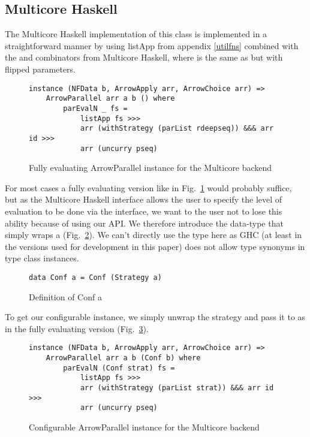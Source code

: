 \subsection{Multicore Haskell}
The Multicore Haskell implementation of this class is implemented in a straightforward manner by using listApp from appendix \ref{utilfns} combined with the  and  combinators from Multicore Haskell, where  is the same as  but with flipped parameters.
\begin{figure}[h]
\begin{lstlisting}[frame=htrbl]
instance (NFData b, ArrowApply arr, ArrowChoice arr) =>
	ArrowParallel arr a b () where
    	parEvalN _ fs =
       		listApp fs >>>
        	arr (withStrategy (parList rdeepseq)) &&& arr id >>>
        	arr (uncurry pseq)
\end{lstlisting}%
\caption{Fully evaluating ArrowParallel instance for the Multicore backend}
\label{fig:ArrowParallelMulticoreRdeepseq}
\end{figure}
For most cases a fully evaluating version like in Fig.~\ref{fig:ArrowParallelMulticoreRdeepseq} would probably suffice, but as the Multicore Haskell interface allows the user to specify the level of evaluation to be done via the  interface, we want to the user not to lose this ability because of using our API. We therefore introduce the  data-type that simply wraps a  (Fig.~\ref{fig:confa}). We can't directly use the  type here as GHC (at least in the versions used for development in this paper) does not allow type synonyms in type class instances.
\begin{figure}[h]
\begin{lstlisting}[frame=htrbl]
data Conf a = Conf (Strategy a)
\end{lstlisting}
\caption{Definition of Conf a}
\label{fig:confa}
\end{figure}
To get our configurable  instance, we simply unwrap the strategy and pass it to  as in the fully evaluating version (Fig.~\ref{fig:ArrowParallelMulticoreConfigurable}).
\begin{figure}[h]
\begin{lstlisting}[frame=htrbl]
instance (NFData b, ArrowApply arr, ArrowChoice arr) =>
	ArrowParallel arr a b (Conf b) where
    	parEvalN (Conf strat) fs =
        	listApp fs >>>
        	arr (withStrategy (parList strat)) &&& arr id >>>
        	arr (uncurry pseq)
\end{lstlisting}
\caption{Configurable ArrowParallel instance for the Multicore backend}
\label{fig:ArrowParallelMulticoreConfigurable}
\end{figure}
